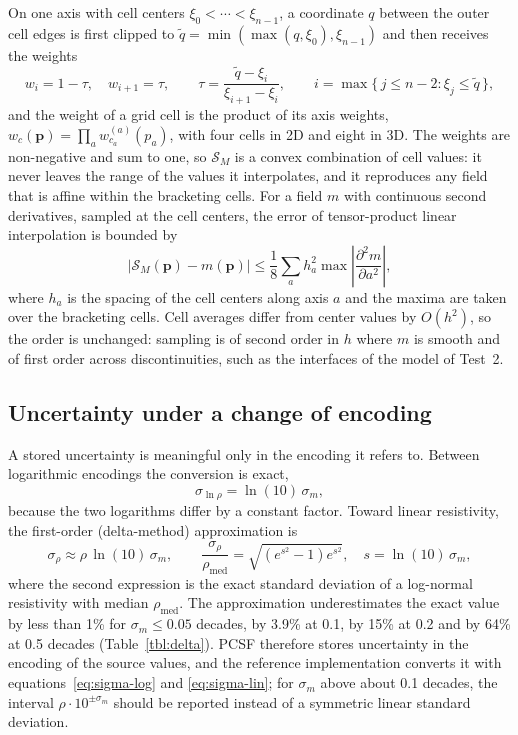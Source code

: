 \documentclass[manuscript]{geophysics}
\begin{document}
On one axis with cell centers $\xi_0 < \cdots < \xi_{n-1}$, a
coordinate $q$ between the outer cell edges is first clipped to
$\tilde{q} = \min(\max(q, \xi_0), \xi_{n-1})$ and then receives the
weights
\begin{equation}
w_i = 1 - \tau,\quad w_{i+1} = \tau,
\qquad
\tau = \frac{\tilde{q} - \xi_i}{\xi_{i+1} - \xi_i},
\qquad
i = \max\{\, j \le n-2 : \xi_j \le \tilde{q} \,\},
\label{eq:weights}
\end{equation}
and the weight of a grid cell is the product of its axis weights,
$w_c(\mathbf{p}) = \prod_a w^{(a)}_{c_a}(p_a)$, with four cells in 2D
and eight in 3D. The weights are non-negative and sum to one, so
$\mathcal{S}_M$ is a convex combination of cell values: it never
leaves the range of the values it interpolates, and it reproduces any
field that is affine within the bracketing cells. For a field $m$
with continuous second derivatives, sampled at the cell centers, the
error of tensor-product linear interpolation is bounded by
\begin{equation}
\left\lvert \mathcal{S}_M(\mathbf{p}) - m(\mathbf{p}) \right\rvert
\le \frac{1}{8} \sum_{a} h_a^{2}
\max \left\lvert \frac{\partial^{2} m}{\partial a^{2}} \right\rvert ,
\label{eq:interp-error}
\end{equation}
where $h_a$ is the spacing of the cell centers along axis $a$ and the
maxima are taken over the bracketing cells. Cell averages differ from
center values by $O(h^2)$, so the order is unchanged: sampling is of
second order in $h$ where $m$ is smooth and of first order across
discontinuities, such as the interfaces of the model of Test~2.

\subsection{Uncertainty under a change of encoding}

A stored uncertainty is meaningful only in the encoding it refers
to. Between logarithmic encodings the conversion is exact,
\begin{equation}
\sigma_{\ln\rho} = \ln(10)\,\sigma_m ,
\label{eq:sigma-log}
\end{equation}
because the two logarithms differ by a constant factor. Toward linear
resistivity, the first-order (delta-method) approximation is
\begin{equation}
\sigma_\rho \approx \rho\,\ln(10)\,\sigma_m ,
\qquad
\frac{\sigma_\rho}{\rho_{\mathrm{med}}} =
\sqrt{\left(e^{s^2} - 1\right) e^{s^2}},\quad s = \ln(10)\,\sigma_m ,
\label{eq:sigma-lin}
\end{equation}
where the second expression is the exact standard deviation of a
log-normal resistivity with median $\rho_{\mathrm{med}}$. The
approximation underestimates the exact value by less than 1\% for
$\sigma_m \le 0.05$ decades, by 3.9\% at 0.1, by 15\% at 0.2 and by 64\%
at 0.5 decades (Table~\ref{tbl:delta}). PCSF therefore stores
uncertainty in the encoding of the source values, and the reference
implementation converts it with equations~\ref{eq:sigma-log} and
\ref{eq:sigma-lin}; for $\sigma_m$ above about 0.1 decades, the
interval $\rho \cdot 10^{\pm\sigma_m}$ should be reported instead of a
symmetric linear standard deviation.
\end{document}
